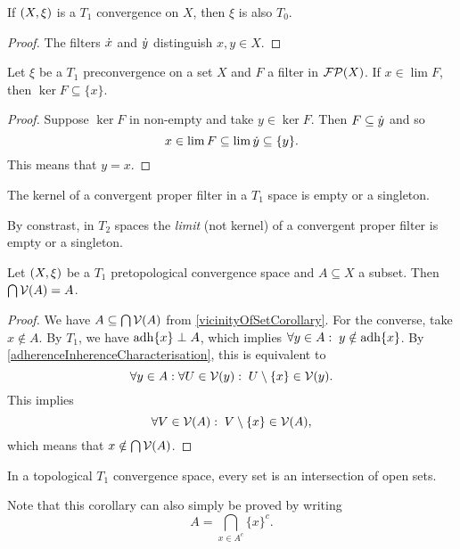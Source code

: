 \begin{lemma}
If $\left( X,\xi \right)$ is a $T_1$ convergence on $X$, then $\xi$ is also $T_0$.
\end{lemma}
\begin{proof}
The filters $\dot{x}$ and $\dot{y}$ distinguish $x,y\in X$.
\end{proof}

\begin{proposition}
Let $\xi$ be a $T_1$ preconvergence on a set $X$ and $F$ a filter in $\operatorname{\mathcal{FP}}(X)$. If $x\in \lim F$, then $\ker F \subseteq \{x\}$.
\end{proposition}
\begin{proof}
Suppose $\ker F$ in non-empty and take $y \in \ker F$. Then $F \subseteq \dot{y}$ and so
\[ x \in \lim F \subseteq \lim \dot{y} \subseteq \{y\}. \]
This means that $y = x$.
\end{proof}
\begin{corollary}
The kernel of a convergent proper filter in a $T_1$ space is empty or a singleton.
\end{corollary}
By constrast, in $T_2$ spaces the \emph{limit} (not kernel) of a convergent proper filter is empty or a singleton.

\begin{proposition} \label{setKernelVicinityFilter}
Let $\left( X,\xi \right)$ be a $T_1$ pretopological convergence space and $A \subseteq X$ a subset. Then $\bigcap\operatorname{\mathcal{V}}(A) = A$.
\end{proposition}
\begin{proof}
We have $A\subseteq \bigcap\operatorname{\mathcal{V}}(A)$ from \ref{vicinityOfSetCorollary}. For the converse, take $x\notin A$. By $T_1$, we have $\operatorname{adh}\{x\} \perp A$, which implies $\forall y\in A:\; y\notin\operatorname{adh}\{x\}$. By \ref{adherenceInherenceCharacterisation}, this is equivalent to
\[ \forall y\in A: \forall U\in \operatorname{\mathcal{V}}(y):\; U\setminus \{x\} \in \operatorname{\mathcal{V}}(y). \]
This implies
\[ \forall V\in \operatorname{\mathcal{V}}(A): \; V\setminus\{x\} \in \operatorname{\mathcal{V}}(A), \]
which means that $x\notin \bigcap\operatorname{\mathcal{V}}(A)$.
\end{proof}
\begin{corollary}
In a topological $T_1$ convergence space, every set is an intersection of open sets.
\end{corollary}
Note that this corollary can also simply be proved by writing
\[ A = \bigcap_{x\in A^c}\{x\}^c. \]

